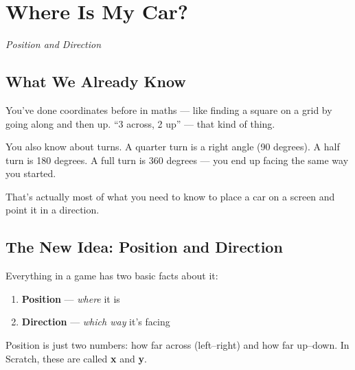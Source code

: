 \documentclass[11pt,a4paper]{article}
\begin{document}
\section{Where Is My Car?}
\textit{\large Position and Direction}

\subsection{What We Already Know}

You've done coordinates before in maths --- like finding a square on a grid by going along and then up. ``3 across, 2 up'' --- that kind of thing.

You also know about turns. A quarter turn is a right angle (90 degrees). A half turn is 180 degrees. A full turn is 360 degrees --- you end up facing the same way you started.

That's actually most of what you need to know to place a car on a screen and point it in a direction.

\subsection{The New Idea: Position and Direction}

Everything in a game has two basic facts about it:

\begin{enumerate}
  \item \textbf{Position} --- \emph{where} it is
  \item \textbf{Direction} --- \emph{which way} it's facing
\end{enumerate}

Position is just two numbers: how far across (left--right) and how far up--down. In Scratch, these are called \textbf{x} and \textbf{y}.

\begin{center}
\end{center}
\end{document}
